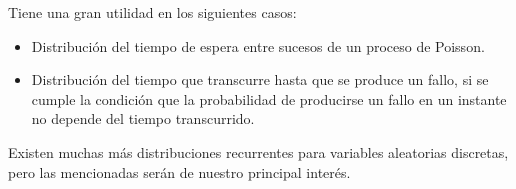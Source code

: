 Tiene una gran utilidad en los siguientes casos:
\begin{itemize}
    \item Distribución del tiempo de espera entre sucesos de un proceso de Poisson.
    \item Distribución del tiempo que transcurre hasta que se produce un fallo, si se cumple la condición que la probabilidad de producirse un fallo en un instante no depende del tiempo transcurrido.
\end{itemize}
Existen muchas más distribuciones recurrentes para variables aleatorias discretas, pero las mencionadas serán de nuestro principal interés.